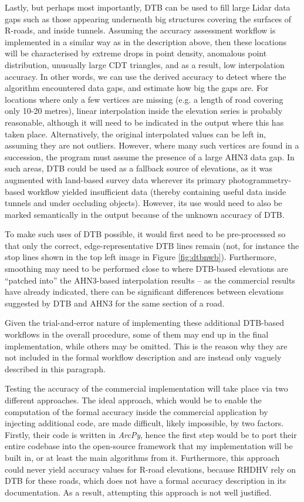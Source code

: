 Lastly, but perhaps most importantly, DTB can be used to fill large Lidar data gaps such as those appearing underneath big structures covering the surfaces of R-roads, and inside tunnels. Assuming the accuracy assessment workflow is implemented in a similar way as in the description above, then these locations will be characterised by extreme drops in point density, anomalous point distribution, unusually large CDT triangles, and as a result, low interpolation accuracy. In other words, we can use the derived accuracy to detect  where the algorithm encountered data gaps, and estimate how big the gaps are. For locations where only a few vertices are missing (e.g. a length of road covering only 10-20 metres), linear interpolation inside the elevation series is probably reasonable, although it will need to be indicated in the output where this has taken place. Alternatively, the original interpolated values can be left in, assuming they are not outliers. However, where many such vertices are found in a succession, the program must assume the presence of a large AHN3 data gap. In such areas, DTB could be used as a fallback source of elevations, as it was augmented with land-based survey data wherever its primary photogrammetry-based workflow yielded insufficient data (thereby containing useful data inside tunnels and under occluding objects). However, its use would need to also be marked semantically in the output because of the unknown accuracy of DTB.

To make such uses of DTB possible, it would first need to be pre-processed so that only the correct, edge-representative DTB lines remain (not, for instance the stop lines shown in the top left image in Figure \ref{fig:dtbnwb}). Furthermore, smoothing may need to be performed close to where DTB-based elevations are “patched into” the AHN3-based interpolation results – as the commercial results have already indicated, there can be significant differences between elevations suggested by DTB and AHN3 for the same section of a road. 

Given the trial-and-error nature of implementing these additional DTB-based workflows in the overall procedure, some of them may end up in the final implementation, while others may be omitted. This is the reason why they are not included in the formal workflow description and are instead only vaguely described in this paragraph.

Testing the accuracy of the commercial implementation will take place via two different approaches. The ideal approach, which would be to enable the computation of the formal accuracy inside the commercial application by injecting additional code, are made difficult, likely impossible, by two factors. Firstly, their code is written in \textit{ArcPy}, hence the first step would be to port their entire codebase into the open-source framework that my implementation will be built in, or at least the main algorithms from it. Furthermore, this approach could never yield accuracy values for R-road elevations, because RHDHV rely on DTB for these roads, which does not have a formal accuracy description in its documentation. As a result, attempting this approach is not well justified.

